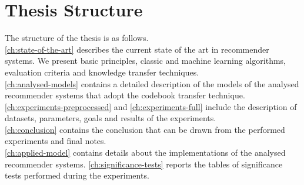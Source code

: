 \section{Thesis Structure}

The structure of the thesis is as follows.\\
\autoref{ch:state-of-the-art} describes the current state of the art in recommender systems. We present basic principles, classic and machine learning algorithms, evaluation criteria and knowledge transfer techniques.\\
\autoref{ch:analysed-models} contains a detailed description of the models of the analysed recommender systems that adopt the codebook transfer technique.\\
\autoref{ch:experiments-preprocessed} and \autoref{ch:experiments-full} include the description of datasets, parameters, goals and results of the experiments.\\
\autoref{ch:conclusion} contains the conclusion that can be drawn from the performed experiments and final notes.\\
\autoref{ch:applied-model} contains details about the implementations of the analysed recommender systems.
\autoref{ch:significance-tests} reports the tables of significance tests performed during the experiments.